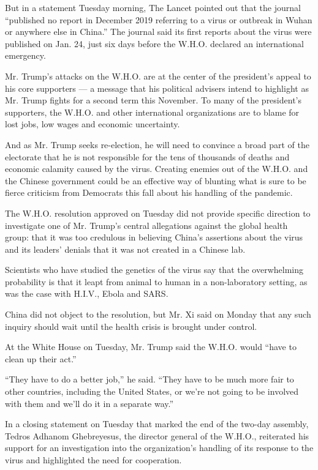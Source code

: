 But in a statement Tuesday morning, The Lancet pointed out that the
journal ``published no report in December 2019 referring to a virus or
outbreak in Wuhan or anywhere else in China.'' The journal said its
first reports about the virus were published on Jan. 24, just six days
before the W.H.O. declared an international emergency.

Mr. Trump's attacks on the W.H.O. are at the center of the president's
appeal to his core supporters --- a message that his political advisers
intend to highlight as Mr. Trump fights for a second term this November.
To many of the president's supporters, the W.H.O. and other
international organizations are to blame for lost jobs, low wages and
economic uncertainty.

And as Mr. Trump seeks re-election, he will need to convince a broad
part of the electorate that he is not responsible for the tens of
thousands of deaths and economic calamity caused by the virus. Creating
enemies out of the W.H.O. and the Chinese government could be an
effective way of blunting what is sure to be fierce criticism from
Democrats this fall about his handling of the pandemic.

The W.H.O. resolution approved on Tuesday did not provide specific
direction to investigate one of Mr. Trump's central allegations against
the global health group: that it was too credulous in believing China's
assertions about the virus and its leaders' denials that it was not
created in a Chinese lab.

Scientists who have studied the genetics of the virus say that the
overwhelming probability is that it leapt from animal to human in a
non-laboratory setting, as was the case with H.I.V., Ebola and SARS.

China did not object to the resolution, but Mr. Xi said on Monday that
any such inquiry should wait until the health crisis is brought under
control.

At the White House on Tuesday, Mr. Trump said the W.H.O. would ``have to
clean up their act.''

``They have to do a better job,'' he said. ``They have to be much more
fair to other countries, including the United States, or we're not going
to be involved with them and we'll do it in a separate way.''

In a closing statement on Tuesday that marked the end of the two-day
assembly, Tedros Adhanom Ghebreyesus, the director general of the
W.H.O., reiterated his support for an investigation into the
organization's handling of its response to the virus and highlighted the
need for cooperation.


